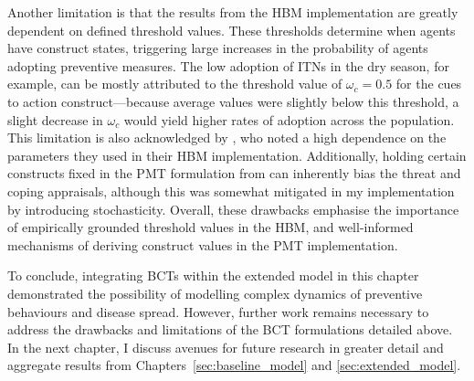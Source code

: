 Another limitation is that the results from the HBM implementation are greatly dependent on defined threshold values. These thresholds determine when agents have  construct states, triggering large increases in the probability of agents adopting preventive measures. The low adoption of ITNs in the dry season, for example, can be mostly attributed to the threshold value of $\omega_c=0.5$ for the cues to action construct---because average values were slightly below this threshold, a slight decrease in $\omega_c$ would yield higher rates of adoption across the population. This limitation is also acknowledged by \citet{durham_incorporating_2012}, who noted a high dependence on the parameters they used in their HBM implementation. Additionally, holding certain constructs fixed in the PMT formulation from \citet{kurchyna_seeing_2024} can inherently bias the threat and coping appraisals, although this was somewhat mitigated in my implementation by introducing stochasticity. Overall, these drawbacks emphasise the importance of empirically grounded threshold values in the HBM, and well-informed mechanisms of deriving construct values in the PMT implementation.

To conclude, integrating BCTs within the extended model in this chapter demonstrated the possibility of modelling complex dynamics of preventive behaviours and disease spread. However, further work remains necessary to address the drawbacks and limitations of the BCT formulations detailed above. In the next chapter, I discuss avenues for future research in greater detail and aggregate results from Chapters~\ref{sec:baseline_model} and \ref{sec:extended_model}.
